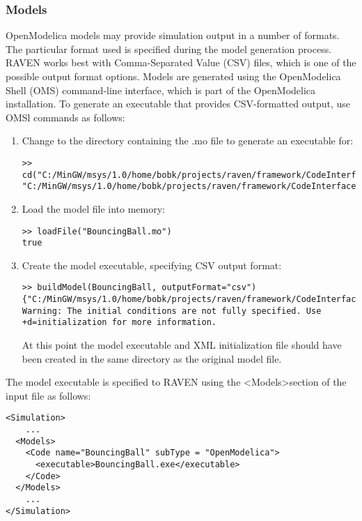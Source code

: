 \subsubsection{Models}
OpenModelica models may provide simulation output in a number of formats.  The particular format used is specified during the model generation
process.  RAVEN works best with Comma-Separated Value (CSV) files, which is one of the possible output format options.  Models are generated
using the OpenModelica Shell (OMS) command-line interface, which is part of the OpenModelica installation.  To generate an executable that provides
CSV-formatted output, use OMSl commands as follows:
 \begin{enumerate}
\item Change to the directory containing the .mo file to generate an executable for:
\begin{lstlisting}
>> cd("C:/MinGW/msys/1.0/home/bobk/projects/raven/framework/CodeInterfaces/OpenModelica")
"C:/MinGW/msys/1.0/home/bobk/projects/raven/framework/CodeInterfaces/OpenModelica"
\end{lstlisting}
\item Load the model file into memory:
\begin{lstlisting}
>> loadFile("BouncingBall.mo")
true
\end{lstlisting}
\item Create the model executable, specifying CSV output format:
\begin{lstlisting}
>> buildModel(BouncingBall, outputFormat="csv")
{"C:/MinGW/msys/1.0/home/bobk/projects/raven/framework/CodeInterfaces/OpenModelica/BouncingBall","BouncingBall_init.xml"}
Warning: The initial conditions are not fully specified. Use +d=initialization for more information.
\end{lstlisting}
At this point the model executable and XML initialization file should have been created in the same directory as the original model file.
\end{enumerate}
The model executable is specified to RAVEN using the \textless Models\textgreater  section of the input file as follows:
\begin{lstlisting}[style=XML]
<Simulation>
    ...
  <Models>
    <Code name="BouncingBall" subType = "OpenModelica">
      <executable>BouncingBall.exe</executable>
    </Code>
  </Models>
    ...
</Simulation>
\end{lstlisting}
